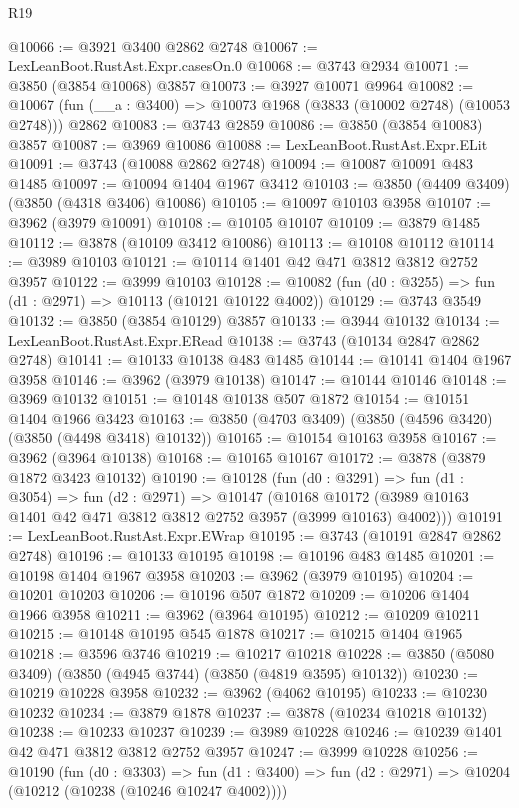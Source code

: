 \begin{lexlean}{R19}
\begin{coremodule}
@10066 := @3921 @3400 @2862 @2748
@10067 := LexLeanBoot.RustAst.Expr.casesOn.{0}
@10068 := @3743 @2934
@10071 := @3850 (@3854 @10068) @3857
@10073 := @3927 @10071 @9964
@10082 := @10067 (fun (__a : @3400) => @10073 @1968 (@3833 (@10002 @2748) (@10053 @2748))) @2862
@10083 := @3743 @2859
@10086 := @3850 (@3854 @10083) @3857
@10087 := @3969 @10086
@10088 := LexLeanBoot.RustAst.Expr.ELit
@10091 := @3743 (@10088 @2862 @2748)
@10094 := @10087 @10091 @483 @1485
@10097 := @10094 @1404 @1967 @3412
@10103 := @3850 (@4409 @3409) (@3850 (@4318 @3406) @10086)
@10105 := @10097 @10103 @3958
@10107 := @3962 (@3979 @10091)
@10108 := @10105 @10107
@10109 := @3879 @1485
@10112 := @3878 (@10109 @3412 @10086)
@10113 := @10108 @10112
@10114 := @3989 @10103
@10121 := @10114 @1401 @42 @471 @3812 @3812 @2752 @3957
@10122 := @3999 @10103
@10128 := @10082 (fun (d0 : @3255) => fun (d1 : @2971) => @10113 (@10121 @10122 @4002))
@10129 := @3743 @3549
@10132 := @3850 (@3854 @10129) @3857
@10133 := @3944 @10132
@10134 := LexLeanBoot.RustAst.Expr.ERead
@10138 := @3743 (@10134 @2847 @2862 @2748)
@10141 := @10133 @10138 @483 @1485
@10144 := @10141 @1404 @1967 @3958
@10146 := @3962 (@3979 @10138)
@10147 := @10144 @10146
@10148 := @3969 @10132
@10151 := @10148 @10138 @507 @1872
@10154 := @10151 @1404 @1966 @3423
@10163 := @3850 (@4703 @3409) (@3850 (@4596 @3420) (@3850 (@4498 @3418) @10132))
@10165 := @10154 @10163 @3958
@10167 := @3962 (@3964 @10138)
@10168 := @10165 @10167
@10172 := @3878 (@3879 @1872 @3423 @10132)
@10190 := @10128
    (fun (d0 : @3291) =>
    fun (d1 : @3054) =>
    fun (d2 : @2971) =>
    @10147
      (@10168 @10172 (@3989 @10163 @1401 @42 @471 @3812 @3812 @2752 @3957 (@3999 @10163) @4002)))
@10191 := LexLeanBoot.RustAst.Expr.EWrap
@10195 := @3743 (@10191 @2847 @2862 @2748)
@10196 := @10133 @10195
@10198 := @10196 @483 @1485
@10201 := @10198 @1404 @1967 @3958
@10203 := @3962 (@3979 @10195)
@10204 := @10201 @10203
@10206 := @10196 @507 @1872
@10209 := @10206 @1404 @1966 @3958
@10211 := @3962 (@3964 @10195)
@10212 := @10209 @10211
@10215 := @10148 @10195 @545 @1878
@10217 := @10215 @1404 @1965
@10218 := @3596 @3746
@10219 := @10217 @10218
@10228 := @3850 (@5080 @3409) (@3850 (@4945 @3744) (@3850 (@4819 @3595) @10132))
@10230 := @10219 @10228 @3958
@10232 := @3962 (@4062 @10195)
@10233 := @10230 @10232
@10234 := @3879 @1878
@10237 := @3878 (@10234 @10218 @10132)
@10238 := @10233 @10237
@10239 := @3989 @10228
@10246 := @10239 @1401 @42 @471 @3812 @3812 @2752 @3957
@10247 := @3999 @10228
@10256 := @10190
    (fun (d0 : @3303) =>
    fun (d1 : @3400) => fun (d2 : @2971) => @10204 (@10212 (@10238 (@10246 @10247 @4002))))

\end{coremodule}
\end{lexlean}
